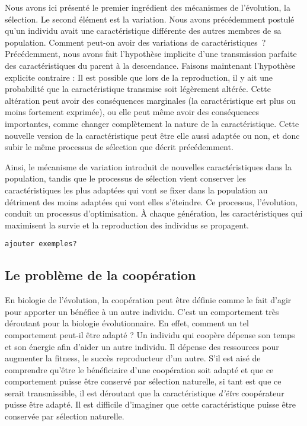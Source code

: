 Nous avons ici présenté le premier ingrédient des mécanismes de l'évolution, la sélection. Le second élément est la variation. Nous avons précédemment postulé qu'un individu avait une caractéristique différente des autres membres de sa population. Comment peut-on avoir des variations de caractéristiques ? Précédemment, nous avons fait l'hypothèse implicite d'une transmission parfaite des caractéristiques du parent à la descendance. Faisons maintenant l'hypothèse explicite contraire : Il est possible que lors de la reproduction, il y ait une probabilité que la caractéristique transmise soit légèrement altérée. Cette altération peut avoir des conséquences marginales (la caractéristique est plus ou moins fortement exprimée), ou elle peut même avoir des conséquences importantes, comme changer complètement la nature de la caractéristique. Cette nouvelle version de la caractéristique peut être elle aussi adaptée ou non, et donc subir le même processus de sélection que décrit précédemment. 

Ainsi, le mécanisme de variation introduit de nouvelles caractéristiques dans la population, tandis que le processus de sélection vient conserver les caractéristiques les plus adaptées qui vont se fixer dans la population au détriment des moins adaptées qui vont elles s'éteindre. Ce processus, l'évolution, conduit un processus d'optimisation. À chaque génération, les caractéristiques qui maximisent la survie et la reproduction des individus se propagent.


\begin{verbatim}
ajouter exemples?
\end{verbatim}

\subsection{Le problème de la coopération}

En biologie de l'évolution, la coopération peut être définie comme le fait d'agir pour apporter un bénéfice à un autre individu. C'est un comportement très déroutant pour la biologie évolutionnaire. En effet, comment un tel comportement peut-il être adapté ? Un individu qui coopère dépense son temps et son énergie afin d'aider un autre individu. Il dépense des ressources pour augmenter la fitness, le succès reproducteur d'un autre. S'il est aisé de comprendre qu'être le bénéficiaire d'une coopération soit adapté et que ce comportement puisse être conservé par sélection naturelle, si tant est que ce serait transmissible, il est déroutant que la caractéristique \emph{d'être} coopérateur puisse être adapté. Il est difficile d'imaginer que cette caractéristique puisse être conservée par sélection naturelle. 

